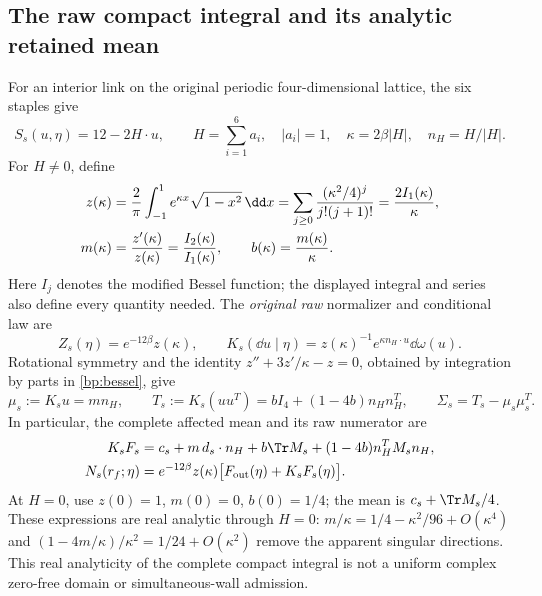 \subsection{The raw compact integral and its analytic retained mean}

For an interior link on the original periodic four-dimensional lattice, the six staples give
\begin{equation}
 S_s(u,\eta)=12-2H\cdot u,
 \qquad H=\sum_{i=1}^6a_i,\quad |a_i|=1,\quad
 \kappa=2\beta|H|,\quad n_H=H/|H|.
 \label{bp:star}
\end{equation}
For $H\ne0$, define
\begin{align}
 z(\kappa)
 &=\frac2\pi\int_{-1}^{1}e^{\kappa x}\sqrt{1-x^2}\,\dd x
 =\sum_{j\ge0}\frac{(\kappa^2/4)^j}{j!(j+1)!}
 =\frac{2I_1(\kappa)}{\kappa},\notag\\
 m(\kappa)&=\frac{z'(\kappa)}{z(\kappa)}
            =\frac{I_2(\kappa)}{I_1(\kappa)},
 \qquad b(\kappa)=\frac{m(\kappa)}{\kappa}.
 \label{bp:bessel}
\end{align}
Here $I_j$ denotes the modified Bessel function; the displayed integral and series also define every quantity needed. The \emph{original raw} normalizer and conditional law are
\begin{equation}
 Z_s(\eta)=e^{-12\beta}z(\kappa),\qquad
 K_s(\dd u\mid\eta)=z(\kappa)^{-1}e^{\kappa n_H\cdot u}\dd\omega(u).
 \label{bp:rawstar}
\end{equation}
Rotational symmetry and the identity $z''+3z'/\kappa-z=0$, obtained by integration by parts in \eqref{bp:bessel}, give
\begin{equation}
 \mu_s:=K_su=mn_H,\qquad
 T_s:=K_s(uu^T)=bI_4+(1-4b)n_Hn_H^T,\qquad
 \Sigma_s=T_s-\mu_s\mu_s^T.
 \label{bp:moments}
\end{equation}
In particular, the complete affected mean and its raw numerator are
\begin{align}
 K_sF_s&=c_s+m\,d_s\cdot n_H+b\Tr M_s
                     +(1-4b)n_H^TM_sn_H,\notag\\
 N_s(r_f;\eta)&=e^{-12\beta}z(\kappa)
                  \bigl[F_{\rm out}(\eta)+K_sF_s(\eta)\bigr].
 \label{bp:completeone}
\end{align}
At $H=0$, use $z(0)=1$, $m(0)=0$, $b(0)=1/4$; the mean is $c_s+\Tr M_s/4$. These expressions are real analytic through $H=0$: $m/\kappa=1/4-\kappa^2/96+O(\kappa^4)$ and $(1-4m/\kappa)/\kappa^2=1/24+O(\kappa^2)$ remove the apparent singular directions. This real analyticity of the complete compact integral is not a uniform complex zero-free domain or simultaneous-wall admission.

